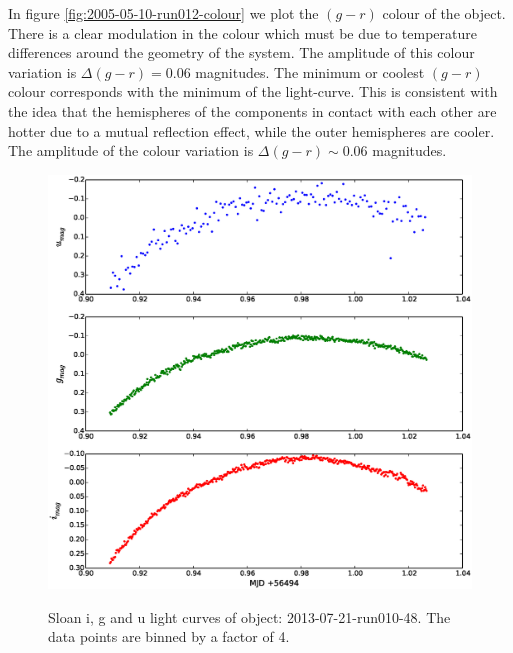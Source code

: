 In figure \ref{fig:2005-05-10-run012-colour} we plot the $(g-r)$ colour of the object. There is a clear modulation in the colour which must be due to temperature differences around the geometry of the system. The amplitude of this colour variation is $\Delta(g-r) = 0.06$ magnitudes. The minimum or coolest $(g - r)$ colour corresponds with the minimum of the light-curve. This is consistent with the idea that the hemispheres of the components in contact with each other are hotter due to a mutual reflection effect, while the outer hemispheres are cooler. The amplitude of the colour variation is $\Delta{(g-r)} \sim 0.06$ magnitudes.


\newpage

\begin{figure}
  \includegraphics[width=120mm]{images/2013-07-21-run010-48_lightcurve-bin4.eps} 
  \label{fig:2013-07-21-run010-48}
  \caption{Sloan i, g and u light curves of object: 2013-07-21-run010-48. The data points are binned by a factor of 4.}
\end{figure}

